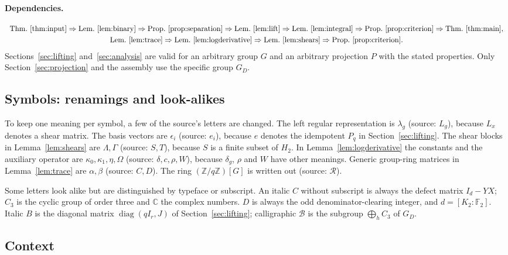 \documentclass[11pt]{article}
\theoremstyle{remark}
\numberwithin{equation}{section}
\newcommand{\F}{\mathbb F}
\newcommand{\Z}{\mathbb Z}
\newcommand{\C}{\mathbb C}
\newcommand{\diag}{\operatorname{diag}}
\begin{document}
\paragraph{Dependencies.}
\[
\begin{array}{c}
\text{Thm.~\ref{thm:input}}\Rightarrow\text{Lem.~\ref{lem:binary}}\Rightarrow\text{Prop.~\ref{prop:separation}}
\Rightarrow\text{Lem.~\ref{lem:lift}}\Rightarrow\text{Lem.~\ref{lem:integral}}\Rightarrow\text{Prop.~\ref{prop:criterion}}\Rightarrow\text{Thm.~\ref{thm:main}},\\[3pt]
\text{Lem.~\ref{lem:trace}}\Rightarrow\text{Lem.~\ref{lem:logderivative}}\Rightarrow\text{Lem.~\ref{lem:shears}}\Rightarrow\text{Prop.~\ref{prop:criterion}} .
\end{array}
\]
Sections~\ref{sec:lifting} and~\ref{sec:analysis} are valid for an arbitrary group $G$ and an arbitrary projection $P$ with the stated properties. Only Section~\ref{sec:projection} and the assembly use the specific group $G_D$.

\subsection{Symbols: renamings and look-alikes}

To keep one meaning per symbol, a few of the source's letters are changed. The left regular representation is $\lambda_g$ (source: $L_g$), because $L_x$ denotes a shear matrix. The basis vectors are $\epsilon_i$ (source: $e_i$), because $e$ denotes the idempotent $P_q$ in Section~\ref{sec:lifting}. The shear blocks in Lemma~\ref{lem:shears} are $\Lambda,\Gamma$ (source: $S,T$), because $S$ is a finite subset of $H_2$. In Lemma~\ref{lem:logderivative} the constants and the auxiliary operator are $\kappa_0,\kappa_1,\eta,\Omega$ (source: $\delta,c,\rho,W$), because $\delta_g$, $\rho$ and $W$ have other meanings. Generic group-ring matrices in Lemma~\ref{lem:trace} are $\alpha,\beta$ (source: $C,D$). The ring $(\Z/q\Z)[G]$ is written out (source: $\mathcal R$).

Some letters look alike but are distinguished by typeface or subscript. An italic $C$ without subscript is always the defect matrix $I_d-YX$; $C_3$ is the cyclic group of order three and $\C$ the complex numbers. $D$ is always the odd denominator-clearing integer, and $d=[K_2:\F_2]$. Italic $B$ is the diagonal matrix $\diag(qI_r,J)$ of Section~\ref{sec:lifting}; calligraphic $\mathcal B$ is the subgroup $\bigoplus_{h}C_3$ of $G_D$.

\subsection{Context}
\end{document}
